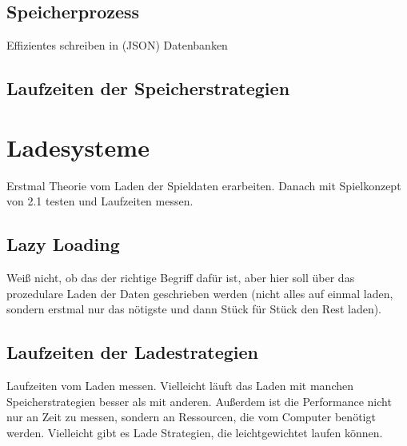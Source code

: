 \subsection{Speicherprozess}
Effizientes schreiben in (JSON) Datenbanken
\subsection{Laufzeiten der Speicherstrategien}

\section{Ladesysteme}
Erstmal Theorie vom Laden der Spieldaten erarbeiten. Danach mit Spielkonzept
von 2.1 testen und Laufzeiten messen.

\subsection{Lazy Loading}
Weiß nicht, ob das der richtige Begriff dafür ist, aber hier soll über das prozedulare 
Laden der Daten geschrieben werden (nicht alles auf einmal laden, sondern erstmal nur das
nötigste und dann Stück für Stück den Rest laden). 

\subsection{Laufzeiten der Ladestrategien}
Laufzeiten vom Laden messen. Vielleicht läuft das Laden mit manchen Speicherstrategien 
besser als mit anderen. Außerdem ist die Performance nicht nur an Zeit zu messen, sondern
an Ressourcen, die vom Computer benötigt werden. Vielleicht gibt es Lade Strategien, die
leichtgewichtet laufen können.